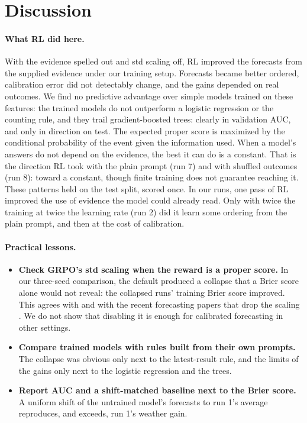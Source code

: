 \documentclass[11pt]{article}
\begin{document}
\section{Discussion}

\paragraph{What RL did here.} With the evidence spelled out and std scaling off, RL improved the forecasts from the supplied evidence under our training setup. Forecasts became better ordered, calibration error did not detectably change, and the gains depended on real outcomes. We find no predictive advantage over simple models trained on these features: the trained models do not outperform a logistic regression or the counting rule, and they trail gradient-boosted trees: clearly in validation AUC, and only in direction on test. The expected proper score is maximized by the conditional probability of the event given the information used. When a model's answers do not depend on the evidence, the best it can do is a constant. That is the direction RL took with the plain prompt (run 7) and with shuffled outcomes (run 8): toward a constant, though finite training does not guarantee reaching it. These patterns held on the test split, scored once. In our runs, one pass of RL improved the use of evidence the model could already read. Only with twice the training at twice the learning rate (run 2) did it learn some ordering from the plain prompt, and then at the cost of calibration.

\paragraph{Practical lessons.}
\begin{itemize}[leftmargin=*]
\item \textbf{Check GRPO's std scaling when the reward is a proper score.} In our three-seed comparison, the default produced a collapse that a Brier score alone would not reveal: the collapsed runs' training Brier score improved. This agrees with \citet{bereket2025uncalibrated} and with the recent forecasting papers that drop the scaling \citep{turtel2026proper,ye2026alphabet}. We do not show that disabling it is enough for calibrated forecasting in other settings.
\item \textbf{Compare trained models with rules built from their own prompts.} The collapse was obvious only next to the latest-result rule, and the limits of the gains only next to the logistic regression and the trees.
\item \textbf{Report AUC and a shift-matched baseline next to the Brier score.} A uniform shift of the untrained model's forecasts to run 1's average reproduces, and exceeds, run 1's weather gain.
\end{itemize}
\end{document}
